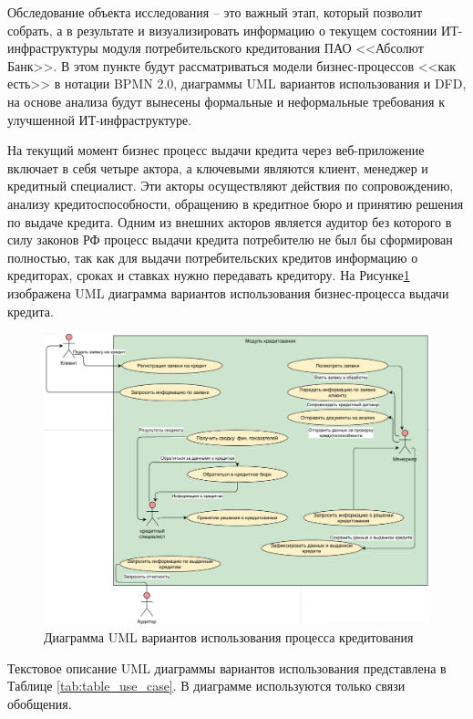 \documentclass[14pt, a4paper]{extarticle}
\begin{document}
Обследование объекта исследования -- это важный этап, который позволит
собрать, а в результате и визуализировать информацию о текущем состоянии
ИТ-инфраструктуры модуля потребительского кредитования ПАО <<Абсолют Банк>>. В
этом пункте будут рассматриваться модели бизнес-процессов <<как есть>> в
нотации BPMN 2.0, диаграммы UML вариантов использования и DFD, на основе
анализа будут вынесены формальные и неформальные требования к улучшенной
ИТ-инфраструктуре.

На текущий момент бизнес процесс выдачи кредита через веб-приложение включает в
себя четыре актора, а ключевыми являются клиент, менеджер и кредитный
специалист. Эти акторы осуществляют действия по сопровождению, анализу
кредитоспособности, обращению в кредитное бюро и принятию решения по выдаче
кредита. Одним из внешних акторов является аудитор без которого в силу законов
РФ процесс выдачи кредита потребителю не был бы сформирован полностью, так как
для выдачи потребительских кредитов информацию о кредиторах, сроках и ставках
нужно передавать кредитору. На Рисунке\;\ref{fig:uml_use_case} изображена UML
диаграмма вариантов использования бизнес-процесса выдачи кредита.

\begin{figure}[H]
	\centering
	\includegraphics[scale=0.38]{uml_use_case_extended}
	\caption{Диаграмма UML вариантов использования процесса кредитования}
	\label{fig:uml_use_case}
\end{figure}

Текстовое описание UML диаграммы вариантов использования представлена в Таблице
\ref{tab:table_use_case}. В диаграмме используются только связи обобщения.
\end{document}
